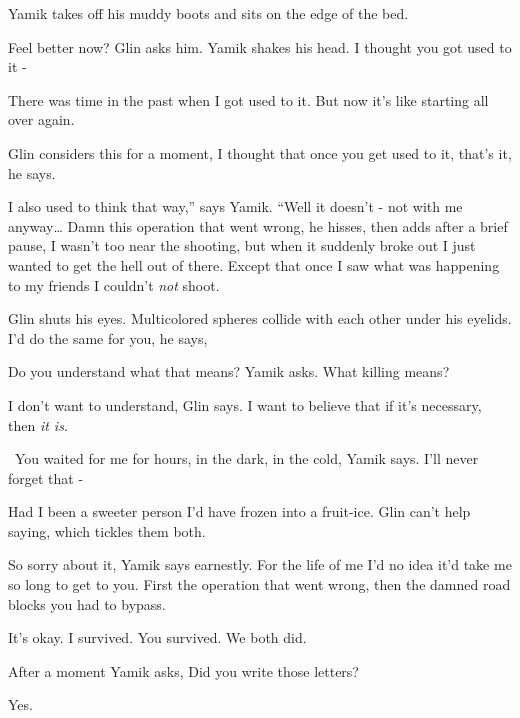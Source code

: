 \documentclass[12pt]{book}
\begin{document}
Yamik takes off his muddy boots and sits on the edge of the bed.

{\textquotedbl}Feel better now?{\textquotedbl} Glin asks him. Yamik shakes his
head.{ }{\textquotedbl}I thought you got used to it -{\textquotedbl}

{\textquotedbl}There was time in the past when I got used to it. But now it's like starting all over
again.{\textquotedbl}

Glin considers this for a moment, {\textquotedbl}I thought that once you get used to it, that's it,{\textquotedbl} he
says.

{\textquotedbl}I also used to think that way,'' says Yamik. ``Well it doesn't - not with me anyway{\dots} Damn this
operation that went wrong,{\textquotedbl} he hisses, then adds after a brief pause,{\textquotedbl} I wasn't too near
the shooting, but when it suddenly{ }broke out I
just{ }wanted to get the hell out of there. Except that once I saw what was
happening to my friends I couldn't \textit{not} shoot.{\textquotedbl}

Glin shuts his eyes. Multicolored spheres collide with each other under his eyelids. {\textquotedbl}I'd do the same for
you,{\textquotedbl} he says,

{\textquotedbl}Do you understand what that means?{\textquotedbl} Yamik asks. {\textquotedbl}What killing
means?{\textquotedbl}

{\textquotedbl}I don't want to understand,{\textquotedbl} Glin says. {\textquotedbl}I want to believe that if it's
necessary, then \textit{it is}.{\textquotedbl}

~{\textquotedbl}You waited for me for hours, in the dark, in the cold,{\textquotedbl} Yamik says. {\textquotedbl}I'll
never forget that -{\textquotedbl}

{\textquotedbl}Had I been a sweeter person I'd have frozen into a fruit-ice.{\textquotedbl} Glin can't help saying,
which tickles them both.

{\textquotedbl}So sorry about it,{\textquotedbl} Yamik says earnestly. {\textquotedbl}For the life of me I'd no idea
it'd take me so long to get to you. First the operation that went wrong, then the damned road blocks you had to
bypass.{\textquotedbl}

{\textquotedbl}It's okay. I survived. You survived. We both did.{\textquotedbl}

After a moment Yamik asks, {\textquotedbl}Did you write those letters?{\textquotedbl}

{\textquotedbl}Yes.{\textquotedbl}
\end{document}
